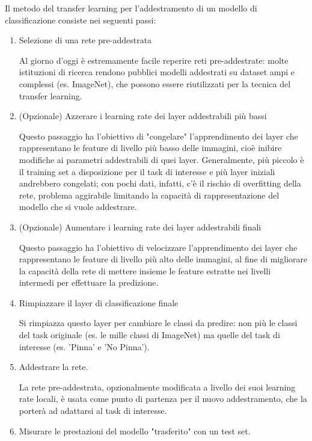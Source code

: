 Il metodo del transfer learning per l'addestramento di un modello di classificazione consiste nei seguenti passi:
\begin{enumerate}
\item Selezione di una rete pre-addestrata

Al giorno d'oggi è estremamente facile reperire reti pre-addestrate: molte istituzioni di ricerca rendono pubblici modelli addestrati su dataset ampi e complessi (es. ImageNet), che possono essere riutilizzati per la tecnica del transfer learning.

\item (Opzionale) Azzerare i learning rate dei layer addestrabili più bassi

Questo passaggio ha l'obiettivo di "congelare" l'apprendimento dei layer che rappresentano le feature di livello più basso delle immagini, cioè inibire modifiche ai parametri addestrabili di quei layer. Generalmente, più piccolo è il training set a disposizione per il task di interesse e più layer iniziali andrebbero congelati; con pochi dati, infatti, c'è il rischio di overfitting della rete, problema aggirabile limitando la capacità di rappresentazione del modello che si vuole addestrare.

\item (Opzionale) Aumentare i learning rate dei layer addestrabili finali

Questo passaggio ha l'obiettivo di velocizzare l'apprendimento dei layer che rappresentano le feature di livello più alto delle immagini, al fine di migliorare la capacità della rete di mettere insieme le feature estratte nei livelli intermedi per effettuare la predizione.

\item Rimpiazzare il layer di classificazione finale

Si rimpiazza questo layer per cambiare le classi da predire: non più le classi del task originale (es. le mille classi di ImageNet) ma quelle del task di interesse (es. 'Pinna' e 'No Pinna').

\item Addestrare la rete.

La rete pre-addestrata, opzionalmente modificata a livello dei suoi learning rate locali, è usata come punto di partenza per il nuovo addestramento, che la porterà ad adattarsi al task di interesse.

\item Misurare le prestazioni del modello "trasferito" con un test set.

\end{enumerate}

